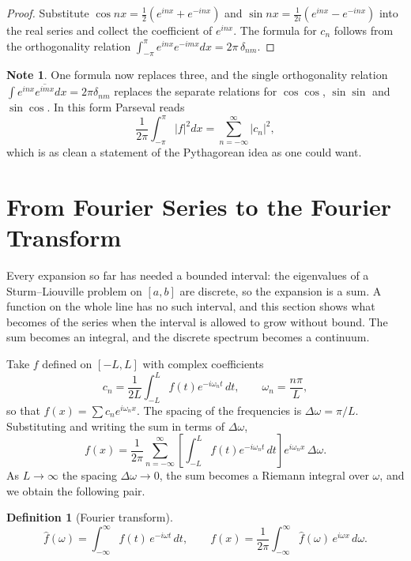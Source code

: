 \documentclass[12pt,a4paper]{report}
\theoremstyle{definition}
\newtheorem{defn}[thm]{Definition}
\newtheorem{note}[thm]{Note}
\theoremstyle{plain}
\begin{document}
\begin{proof}
Substitute $\cos nx = \tfrac12\left(e^{inx}+e^{-inx}\right)$ and
$\sin nx = \tfrac{1}{2i}\left(e^{inx}-e^{-inx}\right)$ into the real series and
collect the coefficient of $e^{inx}$. The formula for $c_n$ follows from the
orthogonality relation
$\int^{\pi}_{-\pi}e^{inx}e^{-imx}dx = 2\pi\,\delta_{nm}$.
\end{proof}

\begin{note}
One formula now replaces three, and the single orthogonality relation
$\int e^{inx}\overline{e^{imx}}dx = 2\pi\delta_{nm}$ replaces the separate
relations for $\cos\cos$, $\sin\sin$ and $\sin\cos$. In this form Parseval reads
$$\frac{1}{2\pi}\int^{\pi}_{-\pi}\left|f\right|^{2}dx
= \sum^{\infty}_{n=-\infty}\left|c_n\right|^{2},$$
which is as clean a statement of the Pythagorean idea as one could want.
\end{note}

\section{From Fourier Series to the Fourier Transform}

Every expansion so far has needed a bounded interval: the eigenvalues of a
Sturm--Liouville problem on $[a,b]$ are discrete, so the expansion is a sum. A
function on the whole line has no such interval, and this section shows what
becomes of the series when the interval is allowed to grow without bound. The
sum becomes an integral, and the discrete spectrum becomes a continuum.

Take $f$ defined on $[-L,L]$ with complex coefficients
$$c_n = \frac{1}{2L}\int^{L}_{-L}f(t)e^{-i\omega_n t}\,dt,
\qquad \omega_n = \frac{n\pi}{L},$$
so that $f(x)=\sum c_n e^{i\omega_n x}$. The spacing of the frequencies is
$\Delta\omega = \pi/L$. Substituting and writing the sum in terms of
$\Delta\omega$,
$$f(x) = \frac{1}{2\pi}\sum^{\infty}_{n=-\infty}
\left[\int^{L}_{-L}f(t)e^{-i\omega_n t}\,dt\right]e^{i\omega_n x}\,\Delta\omega .$$
As $L\to\infty$ the spacing $\Delta\omega\to0$, the sum becomes a Riemann
integral over $\omega$, and we obtain the following pair.

\begin{defn}[Fourier transform]
$$\widehat{f}(\omega) = \int^{\infty}_{-\infty}f(t)\,e^{-i\omega t}\,dt,
\qquad
f(x) = \frac{1}{2\pi}\int^{\infty}_{-\infty}\widehat{f}(\omega)\,e^{i\omega x}\,d\omega .$$
\end{defn}
\end{document}
